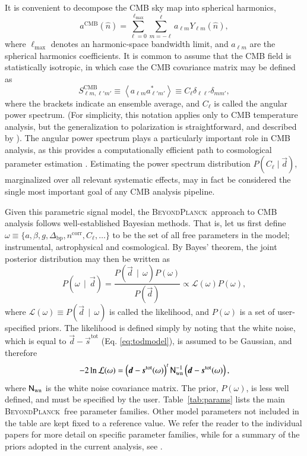 \documentclass[twocolumn]{aa}
\renewcommand{\d}[0]{\vec{d}}
\newcommand{\red}[0]{\color{red}}
\newcommand{\s}[0]{\vec{s}}
\newcommand{\N}[0]{\tens{N}}
\newcommand{\BP}{\textsc{BeyondPlanck}}
\newcommand{\Dbp}[0]{\Delta_{\mathrm{bp}}}
\begin{document}
It is convenient to decompose the CMB sky map into spherical
harmonics,
\begin{equation}
a^{\mathrm{CMB}}(\hat{n}) =
\sum_{\ell=0}^{\ell_{\mathrm{max}}}\sum_{m=-\ell}^{\ell} a_{\ell m}
Y_{\ell m}(\hat{n}),
\end{equation}
where $\ell_{\mathrm{max}}$ denotes an harmonic-space bandwidth limit,
and $a_{\ell m}$ are the spherical harmonics coefficients. It is
common to assume that the CMB field is statistically isotropic, in
which case the CMB covariance matrix may be defined as
\begin{equation}
S_{\ell m, \ell' m'}^{\mathrm{CMB}} \equiv \left<a_{\ell m} a_{\ell'
  m'}^* \right> \equiv C_{\ell}\delta_{\ell \ell'} \delta_{mm'},
\label{eq:cmb_cov}
\end{equation}
where the brackets indicate an ensemble average, and $C_{\ell}$ is
called the angular power spectrum. (For simplicity, this notation
applies only to CMB temperature analysis, but the generalization to
polarization is straightforward, and described by
\citealp{zaldarriaga1997}). The angular power spectrum plays a
particularly important role in CMB analysis, as this provides a
computationally efficient path to cosmological parameter estimation
\citep[e.g.,][]{cosmomc}. Estimating the power spectrum distribution
$P(C_{\ell}\mid\d)$, marginalized over all relevant systematic effects,
may in fact be considered the single most important goal of any CMB
analysis pipeline.

Given this parametric signal model, the \BP\ approach to CMB analysis
follows well-established Bayesian methods. That is, let us first
define $\omega \equiv \{a, \beta, g, \Dbp, n^{\mathrm{corr}}, C_{\ell}, \ldots\}$ to be the set of all free parameters in the model;
instrumental, astrophysical and cosmological. By Bayes' theorem, the
joint posterior distribution may then be written as
\begin{equation}
  P(\omega\,\mid\,\d) = \frac{P(\d\,\mid\,\omega)P(\omega)}{P(\d)}
  \propto \mathcal{L}(\omega)P(\omega),
  \label{eq:joint_posterior_full}
\end{equation}
where $\mathcal{L}(\omega) \equiv P(\d\,\mid\,\omega)$ is called the
likelihood, and $P(\omega)$ is a set of user-specified priors. The
likelihood is defined simply by noting that the white noise, which is
equal to $\d-\s^{\mathrm{tot}}$ (Eq. \ref{eq:todmodel}), is assumed to be Gaussian, and 
therefore
\begin{equation}
-2\ln\mathcal{L}(\omega) = \left(\d-\s^{\mathrm{tot}}(\omega)\right)^t\N_{\mathrm{wn}}^{-1}\left(\d-\s^{\mathrm{tot}}(\omega)\right),
\end{equation}
where $\N_{\mathrm{wn}}$ is the white noise covariance matrix. The
prior, $P(\omega)$, is less well defined, and must be specified by the
user. {\red Table~\ref{tab:params} lists the main \BP\ free parameter families. Other model parameters not included in the table are kept fixed to a reference value. We refer the reader to the individual papers for more detail on specific parameter families, while for} a summary of the priors adopted in the current analysis, see \citet{bp01}.
\end{document}
